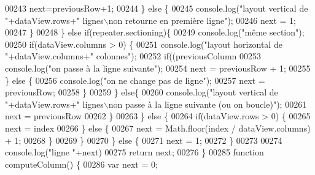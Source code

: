 \begin{DoxyCode}
{00243                             next=previousRow+1;
00244                         \} \textcolor{keywordflow}{else} \{
00245                             console.log(\textcolor{stringliteral}{"layout vertical de "}+dataView.rows+\textcolor{stringliteral}{" lignes\(\backslash\)non retourne en
       première ligne"});
00246                             next = 1;
00247                         \}
00248                     \} \textcolor{keywordflow}{else} \textcolor{keywordflow}{if}(repeater.sectioning)\{
00249                         console.log(\textcolor{stringliteral}{"même section"});
00250                         \textcolor{keywordflow}{if}(dataView.columns > 0) \{
00251                             console.log(\textcolor{stringliteral}{"layout horizontal de "}+dataView.columns+\textcolor{stringliteral}{" colonnes"});
00252                             \textcolor{keywordflow}{if}((previousColumn %
00253                                 console.log(\textcolor{stringliteral}{"on passe à la ligne suivante"});
00254                                 next = previousRow + 1;
00255                             \} \textcolor{keywordflow}{else} \{
00256                                 console.log(\textcolor{stringliteral}{"on ne change pas de ligne"});
00257                                 next = previousRow;
00258                             \}
00259                         \} \textcolor{keywordflow}{else}\{
00260                             console.log(\textcolor{stringliteral}{"layout vertical de "}+dataView.rows+\textcolor{stringliteral}{" lignes\(\backslash\)non passe à la ligne
       suivante (ou on boucle)"});
00261                             next = previousRow %
00262                         \}
00263                     \} \textcolor{keywordflow}{else} \{
00264                         \textcolor{keywordflow}{if}(dataView.rows > 0) \{
00265                             next = index %
00266                         \} \textcolor{keywordflow}{else} \{
00267                             next = Math.floor(index / dataView.columns) + 1;
00268                         \}
00269                     \}
00270                 \} \textcolor{keywordflow}{else} \{
00271                     next = 1;
00272                 \}
00273 
00274                 console.log(\textcolor{stringliteral}{"ligne "}+next)
00275                 \textcolor{keywordflow}{return} next;
00276             \}
00285             \textcolor{keyword}{function} computeColumn() \{
00286                 var next = 0;
}
\end{DoxyCode}
